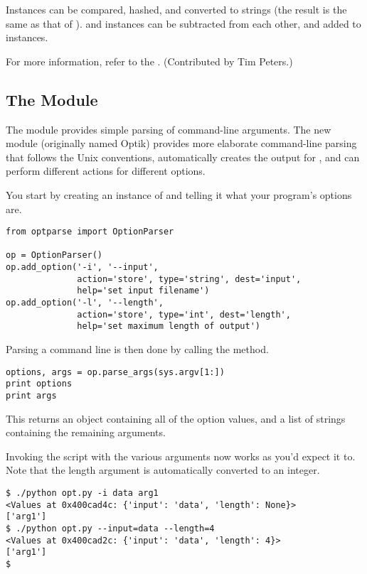 \documentclass{howto}
\begin{document}
Instances can be compared, hashed, and converted to strings (the
result is the same as that of ).   and
 instances can be subtracted from each other, and
added to  instances.

For more information, refer to the .
(Contributed by Tim Peters.)


\subsection{The  Module}

The  module provides simple parsing of command-line
arguments.  The new  module (originally named Optik)
provides more elaborate command-line parsing that follows the Unix
conventions, automatically creates the output for ,
and can perform different actions for different options.

You start by creating an instance of  and telling
it what your program's options are.

\begin{verbatim}
from optparse import OptionParser

op = OptionParser()
op.add_option('-i', '--input',
              action='store', type='string', dest='input',
              help='set input filename')
op.add_option('-l', '--length',
              action='store', type='int', dest='length',
              help='set maximum length of output')
\end{verbatim}

Parsing a command line is then done by calling the 
method.

\begin{verbatim}
options, args = op.parse_args(sys.argv[1:])
print options
print args
\end{verbatim}

This returns an object containing all of the option values, 
and a list of strings containing the remaining arguments. 

Invoking the script with the various arguments now works as you'd
expect it to.  Note that the length argument is automatically
converted to an integer.

\begin{verbatim}
$ ./python opt.py -i data arg1
<Values at 0x400cad4c: {'input': 'data', 'length': None}>
['arg1']
$ ./python opt.py --input=data --length=4
<Values at 0x400cad2c: {'input': 'data', 'length': 4}>
['arg1']
$
\end{verbatim}
\end{document}
